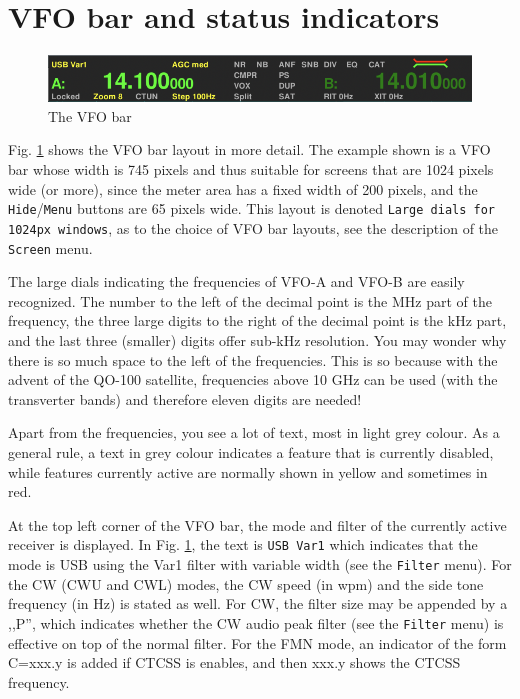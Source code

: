 \documentclass[12pt]{book}
\def\rett#1{\texttt{\color{red}#1}}
\def\bltt#1{\texttt{\color{blue}#1}}
\begin{document}
\section{VFO bar and status  indicators}
\label{sec:VFObar}
\begin{figure}[ht]
\center
\includegraphics[width=12cm]{VFObar.png}
\caption{The VFO bar}
\label{fig:VFObar}
\end{figure}

Fig. \ref{fig:VFObar} shows the VFO bar layout in more  detail.
The example shown is a VFO bar whose width is 745 pixels and
thus suitable for screens that are 1024 pixels wide (or more),
since the meter area has a fixed width of 200 pixels, and
the \rett{Hide}/\rett{Menu} buttons are 65 pixels wide. This layout is
denoted \texttt{Large dials for 1024px windows}, as to the choice
of VFO bar layouts, see the description of the \bltt{Screen} menu.

The large dials indicating the frequencies of VFO-A and VFO-B
are easily recognized. The number to the left of the decimal
point is the MHz part of the frequency, the three  large digits
to the right  of  the decimal point is the kHz part, and
the last three (smaller) digits offer sub-kHz resolution.
You may wonder why there is  so much space to the left of
the frequencies. This is so because with the advent of
the QO-100 satellite, frequencies above 10 GHz can be
used (with the transverter bands) and therefore eleven
digits are needed!

Apart from the frequencies, you see a lot  of text, most in
light grey colour. As a general rule, a text  in grey
colour indicates a feature that is currently disabled,
while features currently active are normally shown in
yellow and sometimes in red.

At the top left  corner of the VFO bar, the mode and
filter of the currently active receiver is displayed. 
In Fig. \ref{fig:VFObar}, the text is \rett{USB Var1}
which indicates that the  mode
is USB using the Var1 filter with variable width (see the \bltt{Filter} menu).
For the CW (CWU and CWL) modes, the CW speed (in wpm) and the side tone
frequency (in Hz) is stated as well. For CW, the filter size may be appended
by a ,,P'', which indicates whether the CW audio peak filter (see the
\bltt{Filter} menu) is effective on top of the normal filter.
For the FMN mode, an indicator of the form C=xxx.y is added if
CTCSS is enables, and then xxx.y shows the CTCSS frequency.
\end{document}
